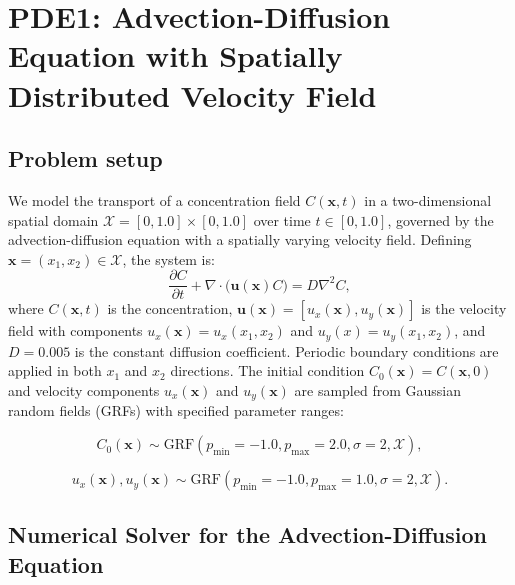 \section{PDE1: Advection-Diffusion Equation with Spatially Distributed Velocity Field}
\label{sec:AD}

\renewcommand{\thefigure}{C.\arabic{figure}}  %
\renewcommand{\thetable}{C.\arabic{table}}  %


\subsection*{Problem setup}
We model the transport of a concentration field \( C(\textbf{x}, t) \) in a two-dimensional spatial domain \(\mathcal{X} = [0, 1.0] \times [0, 1.0]\) over time \( t \in [0, 1.0] \), governed by the advection-diffusion equation with a spatially varying velocity field. Defining \( \textbf{x} = (x_1, x_2) \in \mathcal{X} \), the system is:
\begin{equation}
\frac{\partial C}{\partial t} + \nabla \cdot \bigl( \mathbf{u}(\textbf{x}) C \bigr) = D \nabla^2 C,
\label{eq:advection-diffusion}
\end{equation}
where \( C(\textbf{x}, t) \) is the concentration, \(\mathbf{u}(\textbf{x}) = [u_x(\textbf{x}), u_y(\textbf{x})] \) is the velocity field with components \( u_x(\textbf{x}) = u_x(x_1, x_2) \) and \( u_y(x) = u_y(x_1, x_2) \), and \( D = 0.005 \) is the constant diffusion coefficient. Periodic boundary conditions are applied in both \( x_1 \) and \( x_2 \) directions. The initial condition \( C_0(\mathbf{x}) = C(\mathbf{x}, 0) \) and velocity components \( u_x(\mathbf{x}) \) and \( u_y(\mathbf{x}) \) are sampled from Gaussian random fields (GRFs) with specified parameter ranges:

\begin{equation}
C_0(\mathbf{x}) \sim \text{GRF}(p_{\min} = -1.0, p_{\max} = 2.0, \sigma = 2, \mathcal{X}),
\end{equation}

\begin{equation}
u_x(\mathbf{x}), u_y(\mathbf{x}) \sim \text{GRF}(p_{\min} = -1.0, p_{\max} = 1.0, \sigma = 2, \mathcal{X}).
\end{equation}

\subsection*{Numerical Solver for the Advection-Diffusion Equation}

